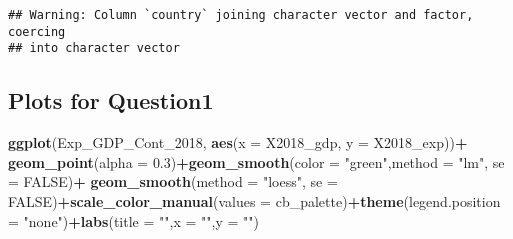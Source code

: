 \documentclass[]{article}
\newenvironment{Shaded}{\begin{snugshade}}{\end{snugshade}}
\newcommand{\DataTypeTok}[1]{\textcolor[rgb]{0.13,0.29,0.53}{#1}}
\newcommand{\DecValTok}[1]{\textcolor[rgb]{0.00,0.00,0.81}{#1}}
\newcommand{\FloatTok}[1]{\textcolor[rgb]{0.00,0.00,0.81}{#1}}
\newcommand{\KeywordTok}[1]{\textcolor[rgb]{0.13,0.29,0.53}{\textbf{#1}}}
\newcommand{\NormalTok}[1]{#1}
\newcommand{\OperatorTok}[1]{\textcolor[rgb]{0.81,0.36,0.00}{\textbf{#1}}}
\newcommand{\OtherTok}[1]{\textcolor[rgb]{0.56,0.35,0.01}{#1}}
\newcommand{\StringTok}[1]{\textcolor[rgb]{0.31,0.60,0.02}{#1}}
\begin{document}
\begin{verbatim}
## Warning: Column `country` joining character vector and factor, coercing
## into character vector
\end{verbatim}

\begin{Shaded}
\end{Shaded}

\hypertarget{plots-for-question1}{%
\subsection{Plots for Question1}\label{plots-for-question1}}

\begin{Shaded}
\begin{Highlighting}[]
\KeywordTok{ggplot}\NormalTok{(Exp_GDP_Cont_}\DecValTok{2018}\NormalTok{, }\KeywordTok{aes}\NormalTok{(}\DataTypeTok{x =}\NormalTok{ X2018_gdp, }\DataTypeTok{y =}\NormalTok{ X2018_exp))}\OperatorTok{+}\StringTok{ }
\StringTok{  }
\StringTok{  }\KeywordTok{geom_point}\NormalTok{(}\DataTypeTok{alpha =} \FloatTok{0.3}\NormalTok{)}\OperatorTok{+}\KeywordTok{geom_smooth}\NormalTok{(}\DataTypeTok{color =} \StringTok{"green"}\NormalTok{,}\DataTypeTok{method =} \StringTok{"lm"}\NormalTok{, }\DataTypeTok{se =} \OtherTok{FALSE}\NormalTok{)}\OperatorTok{+}\StringTok{ }\KeywordTok{geom_smooth}\NormalTok{(}\DataTypeTok{method =} \StringTok{"loess"}\NormalTok{, }\DataTypeTok{se =} \OtherTok{FALSE}\NormalTok{)}\OperatorTok{+}\KeywordTok{scale_color_manual}\NormalTok{(}\DataTypeTok{values =}\NormalTok{ cb_palette)}\OperatorTok{+}\KeywordTok{theme}\NormalTok{(}\DataTypeTok{legend.position =} \StringTok{"none"}\NormalTok{)}\OperatorTok{+}\KeywordTok{labs}\NormalTok{(}\DataTypeTok{title =} \StringTok{""}\NormalTok{,}\DataTypeTok{x =} \StringTok{""}\NormalTok{,}\DataTypeTok{y =} \StringTok{""}\NormalTok{)}
\end{Highlighting}
\end{Shaded}
\end{document}
